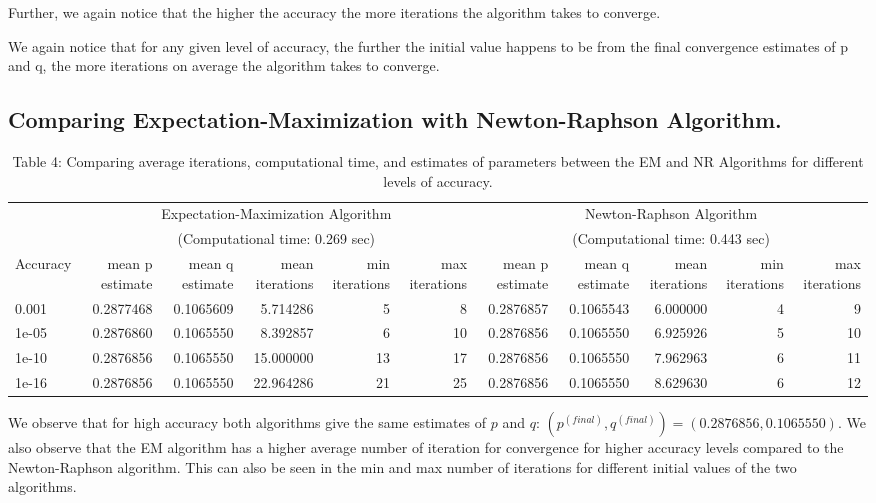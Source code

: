 \documentclass[]{article}
\begin{document}
Further, we again notice that the higher the accuracy the more
iterations the algorithm takes to converge.

We again notice that for any given level of accuracy, the further the
initial value happens to be from the final convergence estimates of p
and q, the more iterations on average the algorithm takes to converge.

\subsection{Comparing Expectation-Maximization with Newton-Raphson
Algorithm.}\label{comparing-expectation-maximization-with-newton-raphson-algorithm.}

\begin{table}[t]

\caption{\label{tab:unnamed-chunk-12}Table 4: Comparing average iterations, computational time, and estimates of parameters between the EM and NR Algorithms for different levels of accuracy.}
\centering
\begin{tabular}{l|r|r|r|r|r|r|r|r|r|r}
\hline
\multicolumn{1}{c|}{ } & \multicolumn{5}{c|}{Expectation-Maximization Algorithm} & \multicolumn{5}{c}{Newton-Raphson Algorithm} \\
\cline{2-6} \cline{7-11}
\multicolumn{1}{c|}{ } & \multicolumn{5}{c|}{(Computational time: 0.269 sec)} & \multicolumn{5}{c}{(Computational time: 0.443 sec)} \\
\cline{2-6} \cline{7-11}
Accuracy & mean p estimate & mean q estimate & mean iterations & min iterations & max iterations & mean p estimate & mean q estimate & mean iterations & min iterations & max iterations\\
\hline
0.001 & 0.2877468 & 0.1065609 & 5.714286 & 5 & 8 & 0.2876857 & 0.1065543 & 6.000000 & 4 & 9\\
\hline
1e-05 & 0.2876860 & 0.1065550 & 8.392857 & 6 & 10 & 0.2876856 & 0.1065550 & 6.925926 & 5 & 10\\
\hline
1e-10 & 0.2876856 & 0.1065550 & 15.000000 & 13 & 17 & 0.2876856 & 0.1065550 & 7.962963 & 6 & 11\\
\hline
1e-16 & 0.2876856 & 0.1065550 & 22.964286 & 21 & 25 & 0.2876856 & 0.1065550 & 8.629630 & 6 & 12\\
\hline
\end{tabular}
\end{table}

We observe that for high accuracy both algorithms give the same
estimates of \(p\) and \(q\):
\((p^{(final)}, q^{(final)}) = (0.2876856, 0.1065550)\). We also observe
that the EM algorithm has a higher average number of iteration for
convergence for higher accuracy levels compared to the Newton-Raphson
algorithm. This can also be seen in the min and max number of iterations
for different initial values of the two algorithms.
\end{document}
